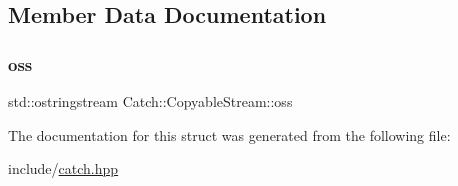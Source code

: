\subsection{Member Data Documentation}
\mbox{\label{struct_catch_1_1_copyable_stream_ae123fb4d673e7d7a13a3c5f6bc5d426c}} 
\subsubsection{\texorpdfstring{oss}{oss}}
{\footnotesize\ttfamily std\+::ostringstream Catch\+::\+Copyable\+Stream\+::oss}



The documentation for this struct was generated from the following file\+:\begin{DoxyCompactItemize}
\item 
include/\mbox{\hyperlink{catch_8hpp}{catch.\+hpp}}\end{DoxyCompactItemize}
